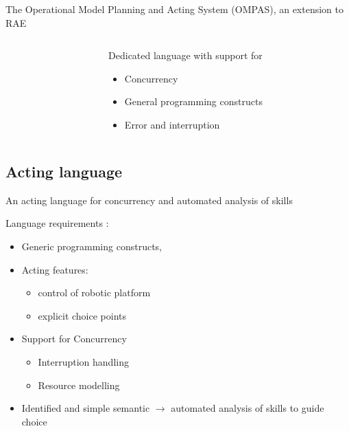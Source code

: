 \begin{frame}{The Operational Model Planning and Acting System (OMPAS), an extension to RAE}
\begin{columns}[t]
\begin{column}{0.5\textwidth}
        \end{column}
        \begin{column}{0.5\textwidth}
        Dedicated language with support for
        \begin{itemize}
            \item Concurrency
            \item General programming constructs
            \item Error and interruption
        \end{itemize}
        \end{column}
    \end{columns}
\end{frame}

\subsection{Acting language}

\begin{frame}[fragile]{An acting language for concurrency and automated analysis of skills}
    
    Language requirements :
    \begin{itemize}
        \item Generic programming constructs,
        \item Acting features:
        \begin{itemize}
            \item control of robotic platform
            \item explicit choice points
        \end{itemize}
        \item Support for Concurrency
        \begin{itemize}
            \item Interruption handling
            \item Resource modelling
        \end{itemize}
        \item Identified and simple semantic $\rightarrow$ automated analysis of skills to guide choice
    \end{itemize}

\end{frame}

